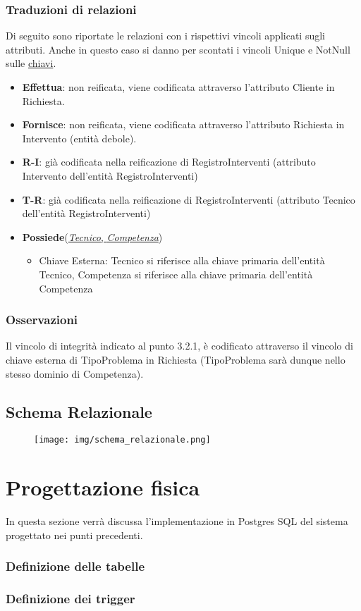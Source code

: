 \documentclass{article}
\begin{document}
\subsubsection{Traduzioni di relazioni}
Di seguito sono riportate le relazioni con i rispettivi vincoli applicati sugli attributi.
Anche in questo caso si danno per scontati i vincoli Unique e NotNull sulle \underline{chiavi}.

\begin{itemize}
    \item \textbf{Effettua}: non reificata, viene codificata attraverso l'attributo Cliente in Richiesta.
    \item \textbf{Fornisce}: non reificata, viene codificata attraverso l'attributo Richiesta in Intervento (entità debole).
    \item \textbf{R-I}: già codificata nella reificazione di RegistroInterventi (attributo Intervento dell'entità RegistroInterventi)
    \item \textbf{T-R}: già codificata nella reificazione di RegistroInterventi (attributo Tecnico dell'entità RegistroInterventi)
    \item \textbf{Possiede}(\underline{\textit{Tecnico}, \textit{Competenza}})
    \begin{itemize}
        \item Chiave Esterna: Tecnico si riferisce alla chiave primaria dell'entità Tecnico, Competenza si riferisce alla chiave primaria dell'entità Competenza
    \end{itemize}
\end{itemize}

\subsubsection{Osservazioni}
Il vincolo di integrità indicato al punto 3.2.1, è codificato attraverso il vincolo di chiave esterna di TipoProblema in Richiesta (TipoProblema sarà dunque nello stesso dominio di Competenza).

\subsection{Schema Relazionale}

\begin{figure}[h!]
    \centering
    \texttt{[image: img/schema\_relazionale.png]}
    \label{fig:ER_Schema}
\end{figure}

\section{Progettazione fisica}

In questa sezione verrà discussa l'implementazione in Postgres SQL del sistema progettato nei punti precedenti.

\subsubsection{Definizione delle tabelle}

\subsubsection{Definizione dei trigger}
\end{document}
